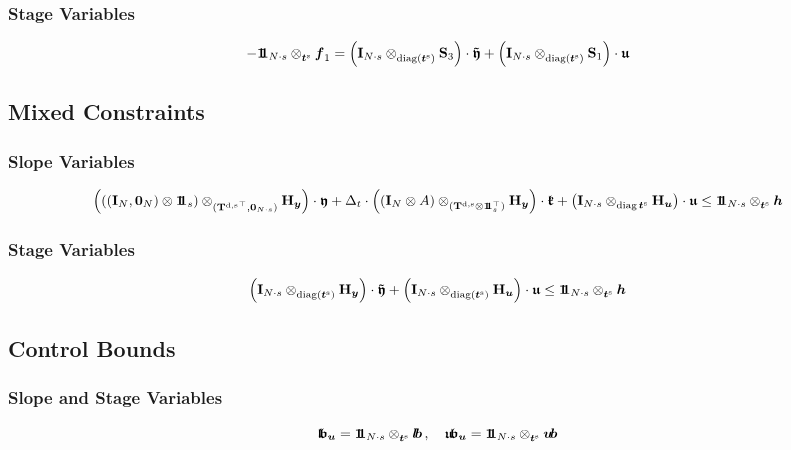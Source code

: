\documentclass{article}
\newcommand{\tp}{\top}%
\newcommand{\kron}{\otimes}%
\newcommand{\dkron}[2][]{\mathbin{\kron_{#2}^{#1}}}%
\newcommand{\diag}{\mathop{\mathrm{diag}}}%
\newcommand{\vectorfont}[1]{\boldsymbol{#1}}%
\newcommand{\greekvectorfont}[1]{\boldsymbol{#1}}%
\newcommand{\matrixfont}[1]{\mathbf{#1}}%
\newcommand{\fvec}{\vectorfont{f}}
\newcommand{\hvec}{\vectorfont{h}}
\newcommand{\tvec}{\vectorfont{t}}
\newcommand{\uvec}{\vectorfont{u}}
\newcommand{\yvec}{\vectorfont{y}}
\newcommand{\kfrakvec}{\vectorfont{\mathfrak{k}}}
\newcommand{\ufrakvec}{\vectorfont{\mathfrak{u}}}
\newcommand{\yfrakvec}{\vectorfont{\mathfrak{y}}}
\newcommand{\tildeyfrakvec}{\vectorfont{\tilde{\mathfrak{y}}}}
\newcommand{\nullvec}{\greekvectorfont{0}}
\newcommand{\lbvec}{\vectorfont{l\negthinspace b}}
\newcommand{\ubvec}{\vectorfont{u\negthinspace b}}
\newcommand{\lbfrakvec}{\vectorfont{\mathfrak{l\negthinspace b}}}
\newcommand{\ubfrakvec}{\vectorfont{\mathfrak{u\negthinspace b}}}
\newcommand{\einsvec}{\vectorfont{1}\negthinspace\negthinspace\vectorfont{1}} %
\newcommand{\Hmat}{\matrixfont{H}}
\newcommand{\Imat}{\matrixfont{I}}%
\newcommand{\Smat}{\matrixfont{S}}
\newcommand{\Tmat}{\matrixfont{T}}
\begin{document}
\subsubsection*{Stage Variables}
\[
-\einsvec_{N \cdot s} \dkron{\tvec^{\mathrm{s}}} \fvec_1 =
\left(\Imat_{N \cdot s} \dkron{\diag (\tvec^{\mathrm{s}})} \Smat_3 \right) \cdot \tildeyfrakvec
+ \left(\Imat_{N \cdot s} \dkron{\diag (\tvec^{\mathrm{s}})} \Smat_1 \right) \cdot \ufrakvec
\]



\subsection*{Mixed Constraints}
\subsubsection*{Slope Variables}
\[
\left( \left( (\Imat_{N}, \nullvec_N) \kron \einsvec_s\right) \dkron{({\Tmat^{\mathrm{d},\mathrm{s}}}^{\tp},\nullvec_{N \cdot s})} \Hmat_{\yvec} \right) \cdot \yfrakvec
+ \Delta_t \cdot \left(  (\Imat_{N} \kron A) \dkron{(\Tmat^{\mathrm{d},\mathrm{s}} \kron \einsvec_s^{\tp})} \Hmat_{\yvec} \right)\cdot \kfrakvec
+ \left(\Imat_{N \cdot s} \dkron{\diag \tvec^{\mathrm{s}}} \Hmat_{\uvec}  \right) \cdot \ufrakvec
\leq \einsvec_{N\cdot s} \dkron{\tvec^{\mathrm{s}}} \hvec
\]
\subsubsection*{Stage Variables}
\[
\left(\Imat_{N \cdot s} \dkron{\diag (\tvec^{\mathrm{s}})} \Hmat_{\yvec} \right) \cdot \tildeyfrakvec
+ \left(\Imat_{N \cdot s} \dkron{\diag (\tvec^{\mathrm{s}})} \Hmat_{\uvec} \right) \cdot \ufrakvec
\leq \einsvec_{N \cdot s} \dkron{\tvec^{\mathrm{s}}} \hvec 
\]


\subsection*{Control Bounds}
\subsubsection*{Slope and Stage Variables}
\[
\lbfrakvec_{\uvec} = \einsvec_{N\cdot s} \dkron{\tvec^{\mathrm{s}}} \lbvec \,,\quad
\ubfrakvec_{\uvec} = \einsvec_{N\cdot s} \dkron{\tvec^{\mathrm{s}}} \ubvec
\]
\end{document}
